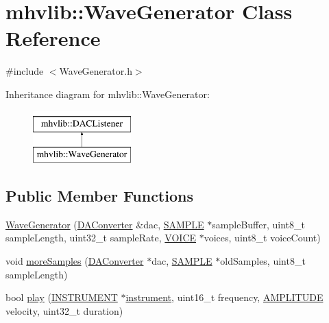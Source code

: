 \hypertarget{classmhvlib_1_1_wave_generator}{\section{mhvlib\-:\-:Wave\-Generator Class Reference}
\label{classmhvlib_1_1_wave_generator}
}


{\ttfamily \#include $<$Wave\-Generator.\-h$>$}

Inheritance diagram for mhvlib\-:\-:Wave\-Generator\-:\begin{figure}[H]
\begin{center}
\leavevmode
\includegraphics[height=2.000000cm]{classmhvlib_1_1_wave_generator}
\end{center}
\end{figure}
\subsection*{Public Member Functions}
\begin{DoxyCompactItemize}
\item 
\hyperlink{classmhvlib_1_1_wave_generator_a94c09be1bf425617beb0246de886b413}{Wave\-Generator} (\hyperlink{classmhvlib_1_1_d_a_converter}{D\-A\-Converter} \&dac, \hyperlink{_d_a_c_8h_a5a6d1dc37ffa32957a63868cd1da39b3}{S\-A\-M\-P\-L\-E} $\ast$sample\-Buffer, uint8\-\_\-t sample\-Length, uint32\-\_\-t sample\-Rate, \hyperlink{namespacemhvlib_a30dd69204107a88716243d57489dc5bc}{V\-O\-I\-C\-E} $\ast$voices, uint8\-\_\-t voice\-Count)
\item 
void \hyperlink{classmhvlib_1_1_wave_generator_ae762329a0b43aea45f4bcf58ad47fb9b}{more\-Samples} (\hyperlink{classmhvlib_1_1_d_a_converter}{D\-A\-Converter} $\ast$dac, \hyperlink{_d_a_c_8h_a5a6d1dc37ffa32957a63868cd1da39b3}{S\-A\-M\-P\-L\-E} $\ast$old\-Samples, uint8\-\_\-t sample\-Length)
\item 
bool \hyperlink{classmhvlib_1_1_wave_generator_a02ef7631bb0b3ce8c4c7c4c0c6c041a4}{play} (\hyperlink{namespacemhvlib_abe46c8922ff2f901a0a36e388bb411bc}{I\-N\-S\-T\-R\-U\-M\-E\-N\-T} $\ast$\hyperlink{structmhvlib_1_1instrument}{instrument}, uint16\-\_\-t frequency, \hyperlink{namespacemhvlib_a15ca117fe572109e56c947a4c6612e7e}{A\-M\-P\-L\-I\-T\-U\-D\-E} velocity, uint32\-\_\-t duration)
\end{DoxyCompactItemize}


